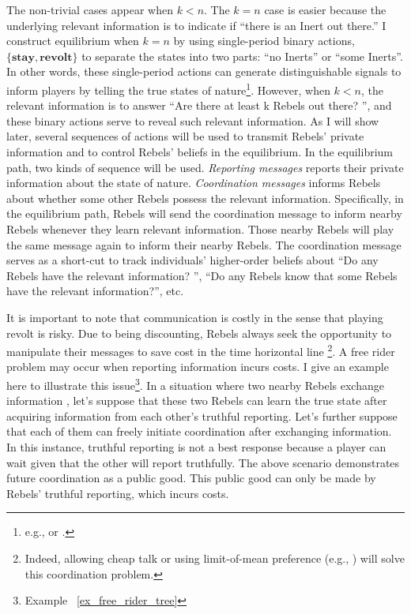 \documentclass[12pt,letterpaper]{article}
\theoremstyle{definition}
\theoremstyle{remark}
\theoremstyle{claim}
\begin{document}
The non-trivial cases appear when $k<n$. The $k=n$ case is easier because the underlying relevant information is to indicate if ``there is an Inert out there.'' I construct equilibrium when $k=n$ by using single-period binary actions, $\{\textbf{stay},\textbf{revolt}\}$ to separate the states into two parts: ``no Inerts'' or ``some Inerts''. In other words, these single-period actions can generate distinguishable signals to inform players by telling the true states of nature\footnote{e.g., \citep{Fudenberg2010} or \citep{Fudenberg2011}.}. However, when $k<n$, the relevant information is to answer ``Are there at least k Rebels out there? '', and these binary actions serve to reveal such relevant information. As I will show later, several sequences of actions will be used to transmit Rebels' private information and to control Rebels' beliefs in the equilibrium. In the equilibrium path, two kinds of sequence will be used. \textit{Reporting messages} reports their private information about the state of nature. \textit{Coordination messages} informs Rebels about whether some other Rebels possess the relevant information. Specifically, in the equilibrium path, Rebels will send the coordination message to inform nearby Rebels whenever they learn relevant information. Those nearby Rebels will play the same message again to inform their nearby Rebels. The coordination message serves as a short-cut to track individuals' higher-order beliefs about ``Do any Rebels have the relevant information? '', ``Do any Rebels know that some Rebels have the relevant information?'', etc.



It is important to note that communication is costly in the sense that playing revolt is risky. Due to being discounting, Rebels always seek the opportunity to manipulate their messages to save cost in the time horizontal line \footnote{Indeed, allowing cheap talk or using limit-of-mean preference (e.g., \citep{Renault1998}) will solve this coordination problem.}. A free rider problem may occur when reporting information incurs costs. I give an example here to illustrate this issue\footnote{Example ~\ref{ex_free_rider_tree}}. In a situation where two nearby Rebels exchange information  , let's suppose that these two Rebels can learn the true state after acquiring information from each other's truthful reporting. Let's further suppose that each of them can freely initiate coordination after exchanging information. In this instance, truthful reporting is not a best response because a player can wait given that the other will report truthfully. The above scenario demonstrates future coordination as a public good. This public good can only be made by Rebels' truthful reporting, which incurs costs.
\end{document}
